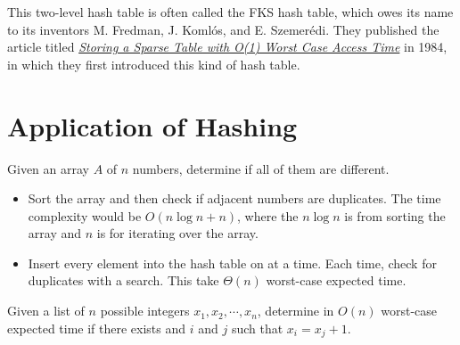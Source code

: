 \begin{remark}
    This two-level hash table is often called the FKS hash table, which owes its name to its inventors M. Fredman, J. Koml\'{o}s, and E. Szemer\'{e}di. They published the article titled \href{https://www.cs.dartmouth.edu/~ac/Teach/CS105-Winter05/Handouts/fks-perfecthash.pdf}{\textit{Storing a Sparse Table with O(1) Worst Case Access Time}} in 1984, in which they first introduced this kind of hash table.
\end{remark}

\section{Application of Hashing}

Given an array $A$ of $n$ numbers, determine if all of them are different.

\begin{itemize}
    \item Sort the array and then check if adjacent numbers are duplicates. The time complexity would be $O(n\log n + n)$, where the $n\log n$ is from sorting the array and $n$ is for iterating over the array.
    \item Insert every element into the hash table on at a time. Each time, check for duplicates with a search. This take $\Theta(n)$ worst-case expected time.
\end{itemize}

Given a list of $n$ possible integers $x_1,x_2,\cdots,x_n$, determine in $O(n)$ worst-case expected time if there exists and $i$ and $j$ such that $x_i = x_j + 1$.